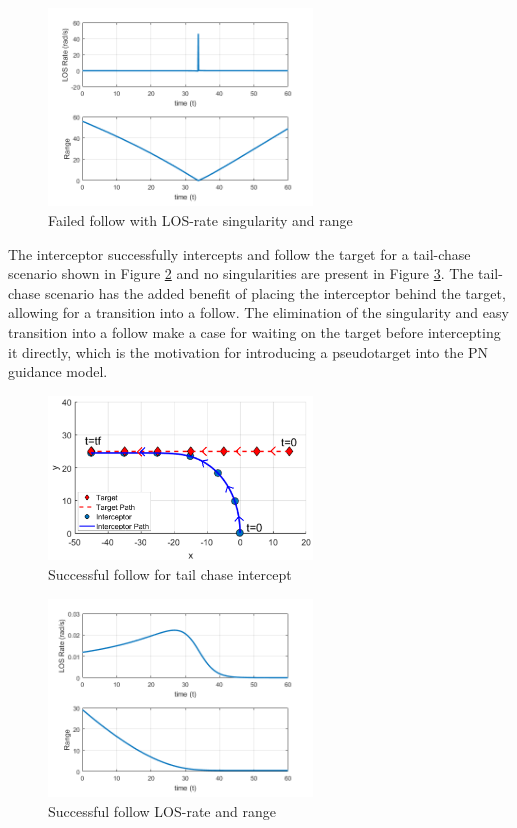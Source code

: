 \documentclass[conference]{IEEEtran}
\begin{document}
\begin{figure}[H]
	\centering
	\includegraphics[width=7cm] {x50_range_LOSrate}
	\caption{Failed follow with LOS-rate singularity and range}
	\label{fig:failedInterceptLOS}
	\hspace*{0mm}
\end{figure}


The interceptor successfully intercepts and follow the target for a tail-chase scenario shown in Figure \ref{fig:successfulFollow} and no singularities are present in Figure \ref{fig:successfulFollowLOS}. The tail-chase scenario has the added benefit of placing the interceptor behind the target, allowing for a transition into a follow. The elimination of the singularity and easy transition into a follow make a case for waiting on the target before intercepting it directly, which is the motivation for introducing a pseudotarget into the PN guidance model.

\begin{figure}[H]
	\centering
	\includegraphics[width=7cm] {tailChaseWithLedgend}
	\caption{Successful follow for tail chase intercept}
	\label{fig:successfulFollow}
	\hspace*{0mm}
\end{figure}

\begin{figure}[H]
	\centering
	\includegraphics[width=7cm] {x15_range_LOSrate}
	\caption{Successful follow LOS-rate and range}
	\label{fig:successfulFollowLOS}
		\hspace*{0mm}
\end{figure}
\end{document}
